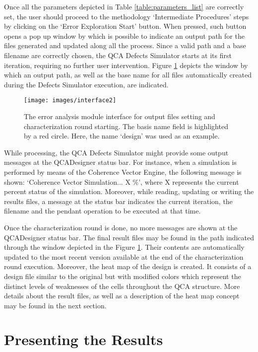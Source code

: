 Once all the parameters depicted in Table \ref{table:parameters_list} are correctly set, the user should proceed to the methodology `Intermediate Procedures' steps by clicking on the `Error Exploration Start' button. When pressed, such button opens a pop up window by which is possible to indicate an output path for the files generated and updated along all the process. Since a valid path and a base filename are correctly chosen, the QCA Defects Simulator starts at its first iteration, requiring no further user intervention. Figure \ref{figure:interface2} depicts the window by which an output path, as well as the base name for all files automatically created during the Defects Simulator execution, are indicated.

\begin{figure}[H]
\center
\texttt{[image: images/interface2]}
\caption{The error analysis module interface for output files setting and characterization round starting. The basis name field is highlighted by a red circle. Here, the name `design' was used as an example.}
\label{figure:interface2}
\end{figure}

While processing, the QCA Defects Simulator might provide some output messages at the QCADesigner status bar. For instance, when a simulation is performed by means of the Coherence Vector Engine, the following message is shown: `Coherence Vector Simulation... X \%', where X represents the current percent status of the simulation. Moreover, while reading, updating or writing the results files, a message at the status bar indicates the current iteration, the filename and the pendant operation to be executed at that time. 

Once the characterization round is done, no more messages are shown at the QCADesigner status bar. The final result files may be found in the path indicated through the window depicted in the Figure \ref{figure:interface2}. Their contents are automatically updated to the most recent version available at the end of the characterization round execution. Moreover, the heat map of the design is created. It consists of a design file similar to the original but with modified colors which represent the distinct levels of weaknesses of the cells throughout the QCA structure. More details about the result files, as well as a description of the heat map concept may be found in the next section.

\section{Presenting the Results}
\label{subsection:presenting_the_results}

